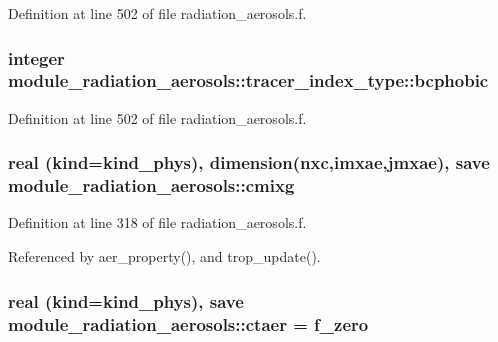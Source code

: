 Definition at line 502 of file radiation\+\_\+aerosols.\+f.

\subsubsection[{\texorpdfstring{bcphobic}{bcphobic}}]{\setlength{\rightskip}{0pt plus 5cm}integer module\+\_\+radiation\+\_\+aerosols\+::tracer\+\_\+index\+\_\+type\+::bcphobic\hspace{0.3cm}{\ttfamily [private]}}\hypertarget{group__module__radiation__aerosols_ga4b1c1a1b44b5eb68ec19abb48e748fa0}{}\label{group__module__radiation__aerosols_ga4b1c1a1b44b5eb68ec19abb48e748fa0}


Definition at line 502 of file radiation\+\_\+aerosols.\+f.

\subsubsection[{\texorpdfstring{cmixg}{cmixg}}]{\setlength{\rightskip}{0pt plus 5cm}real (kind=kind\+\_\+phys), dimension(nxc,imxae,jmxae), save module\+\_\+radiation\+\_\+aerosols\+::cmixg\hspace{0.3cm}{\ttfamily [private]}}\hypertarget{group__module__radiation__aerosols_ga358c83599fb321a59c958e54d9f284d9}{}\label{group__module__radiation__aerosols_ga358c83599fb321a59c958e54d9f284d9}


Definition at line 318 of file radiation\+\_\+aerosols.\+f.



Referenced by aer\+\_\+property(), and trop\+\_\+update().

\subsubsection[{\texorpdfstring{ctaer}{ctaer}}]{\setlength{\rightskip}{0pt plus 5cm}real (kind=kind\+\_\+phys), save module\+\_\+radiation\+\_\+aerosols\+::ctaer = f\+\_\+zero\hspace{0.3cm}{\ttfamily [private]}}\hypertarget{group__module__radiation__aerosols_ga4b0aa142aee31c40361dadc390ccc68e}{}\label{group__module__radiation__aerosols_ga4b0aa142aee31c40361dadc390ccc68e}


